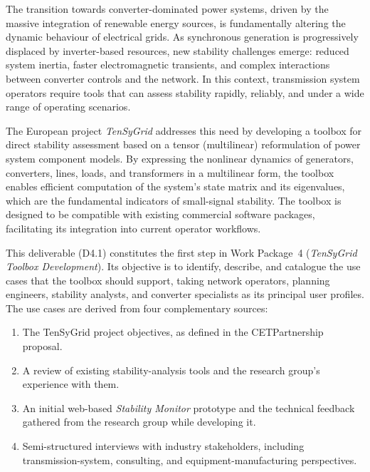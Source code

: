 The transition towards converter-dominated power systems, driven by the massive integration of renewable energy sources, is fundamentally altering the dynamic behaviour of electrical grids. As synchronous generation is progressively displaced by inverter-based resources, new stability challenges emerge: reduced system inertia, faster electromagnetic transients, and complex interactions between converter controls and the network. In this context, transmission system operators require tools that can assess stability rapidly, reliably, and under a wide range of operating scenarios.

The European project \textit{TenSyGrid} addresses this need by developing a toolbox for direct stability assessment based on a tensor (multilinear) reformulation of power system component models. By expressing the nonlinear dynamics of generators, converters, lines, loads, and transformers in a multilinear form, the toolbox enables efficient computation of the system's state matrix and its eigenvalues, which are the fundamental indicators of small-signal stability. The toolbox is designed to be compatible with existing commercial software packages, facilitating its integration into current operator workflows.

This deliverable (D4.1) constitutes the first step in Work Package~4 (\textit{TenSyGrid Toolbox Development}). Its objective is to identify, describe, and catalogue the use cases that the toolbox should support, taking network operators, planning engineers, stability analysts, and converter specialists as its principal user profiles. The use cases are derived from four complementary sources:

\begin{enumerate}
  \item The TenSyGrid project objectives, as defined in the CETPartnership proposal.
  \item A review of existing stability-analysis tools and the research group's experience with them.
  \item An initial web-based \textit{Stability Monitor} prototype and the technical feedback gathered from the research group while developing it.
  \item Semi-structured interviews with industry stakeholders, including transmission-system, consulting, and equipment-manufacturing perspectives.
\end{enumerate}

